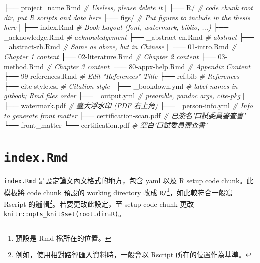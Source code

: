 \documentclass[oneside]{book}
\newenvironment{Shaded}{\begin{snugshade}}{\end{snugshade}}
\newcommand{\CommentTok}[1]{\textcolor[rgb]{0.56,0.35,0.01}{\textit{#1}}}
\newcommand{\NormalTok}[1]{#1}
\begin{document}
\begin{Shaded}
\begin{Highlighting}[]
\NormalTok{├── project_name.Rmd     }\CommentTok{# Useless, please delete it}
\NormalTok{|}
\NormalTok{├── R/                   }\CommentTok{# code chunk root dir, put R scripts and data here}
\NormalTok{├── figs/                }\CommentTok{# Put figures to include in the thesis here}
\NormalTok{|}
\NormalTok{├── index.Rmd            }\CommentTok{# Book Layout (font, watermark, biblio, ...)}
\NormalTok{├── _acknowledge.Rmd     }\CommentTok{# acknowledgement}
\NormalTok{├── _abstract-en.Rmd     }\CommentTok{# abstract}
\NormalTok{├── _abstract-zh.Rmd     }\CommentTok{# Same as above, but in Chinese}
\NormalTok{|}
\NormalTok{├── 01-intro.Rmd         }\CommentTok{# Chapter 1 content}
\NormalTok{├── 02-literature.Rmd    }\CommentTok{# Chapter 2 content}
\NormalTok{├── 03-method.Rmd        }\CommentTok{# Chapter 3 content}
\NormalTok{├── 80-appx-help.Rmd     }\CommentTok{# Appendix Content}
\NormalTok{├── 99-references.Rmd    }\CommentTok{# Edit "References" Title}
\NormalTok{├── ref.bib              }\CommentTok{# References}
\NormalTok{├── cite-style.csl       }\CommentTok{# Citation style}
\NormalTok{|}
\NormalTok{├── _bookdown.yml        }\CommentTok{# label names in gitbook; Rmd files order}
\NormalTok{├── _output.yml          }\CommentTok{# preamble, pandoc args, cite-pkg}
\NormalTok{|}
\NormalTok{├── watermark.pdf        }\CommentTok{# 臺大浮水印 (PDF 右上角)}
\NormalTok{├── _person-info.yml      }\CommentTok{# Info to generate front matter}
\NormalTok{├── certification-scan.pdf  }\CommentTok{# 已簽名'口試委員審查書'}
\NormalTok{└── front_matter}
\NormalTok{    └── certification.pdf   }\CommentTok{# 空白'口試委員審查書'}
\end{Highlighting}
\end{Shaded}

\hypertarget{index-rmd}{%
\section{\texorpdfstring{\texttt{index.Rmd}}{index.Rmd}}\label{index-rmd}}

\texttt{index.Rmd} 是設定論文內文格式的地方，包含 yaml 以及 R setup code chunk。此模板將 code chunk 預設的 working directory 改成 \texttt{R/}\footnote{預設是 Rmd 檔所在的位置。}，如此較符合一般寫 Rscript 的邏輯\footnote{例如，使用相對路徑匯入資料時，一般會以 Rscript 所在的位置作為基準。}。若要更改此設定，至 setup code chunk 更改 \texttt{knitr::opts\_knit\$set(root.dir=\textquotesingle{}R\textquotesingle{})}。
\end{document}
